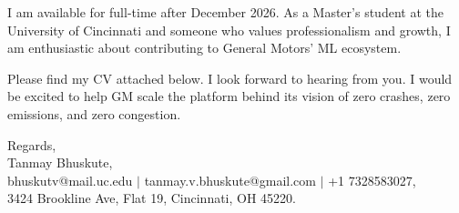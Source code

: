 \documentclass[11pt]{letter}
\begin{document}
\begin{letter}{}
I am available for full-time after December 2026. As a Master's student at the University of Cincinnati and someone who values professionalism and growth, I am enthusiastic about contributing to General Motors' ML ecosystem.

Please find my CV attached below. I look forward to hearing from you. I would be excited to help GM scale the platform behind its vision of zero crashes, zero emissions, and zero congestion.

{\setlength{\parskip}{0pt}
Regards,\\
Tanmay Bhuskute,\\
bhuskutv@mail.uc.edu $\mid$ tanmay.v.bhuskute@gmail.com $\mid$ +1 7328583027,\\
3424 Brookline Ave, Flat 19, Cincinnati, OH 45220.
}

\end{letter}
\end{document}
